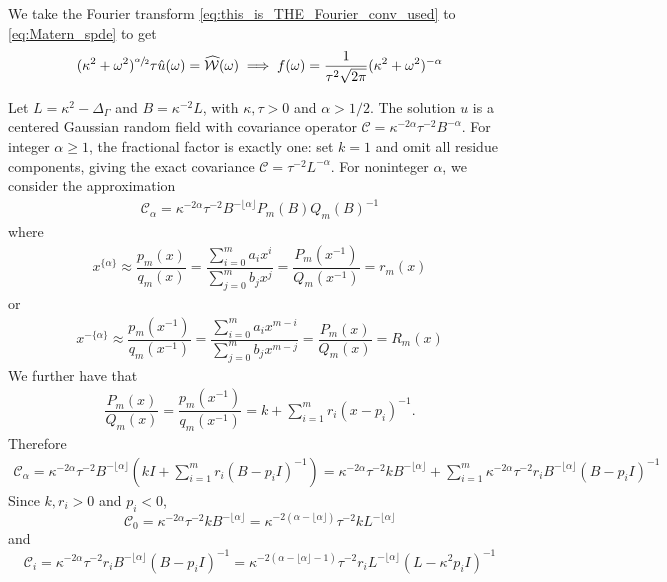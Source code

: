 \documentclass[11pt,a4paper]{article}
\theoremstyle{plain}
\theoremstyle{definition}
\begin{document}
We take the Fourier transform \eqref{eq:this_is_THE_Fourier_conv_used} to \eqref{eq:Matern_spde} to get
\begin{align}
    (\kappa^2+\omega^2)^{\sfrac{\alpha}{2}}\tau\hat{u}(\omega) = \widehat{\mathcal{W}}(\omega)\implies
    f(\omega) = \dfrac{1}{\tau^2\sqrt{2\pi}}(\kappa^2+\omega^2)^{-\alpha}
\end{align}

Let $L = \kappa^2 - \Delta_\Gamma$ and $B =\kappa^{-2}L$, with
$\kappa,\tau>0$ and $\alpha>1/2$. The solution $u$ is a centered
Gaussian random field with covariance operator
$\mathcal{C} = \kappa^{-2\alpha}\tau^{-2}B^{-\alpha}$.
For integer $\alpha\geq1$, the fractional factor is exactly one:
set $k=1$ and omit all residue components, giving the exact covariance
$\mathcal C=\tau^{-2}L^{-\alpha}$.
For noninteger $\alpha$, we consider the approximation
\begin{align}
    \mathcal{C}_\alpha = \kappa^{-2\alpha}\tau^{-2}B^{-\lfloor\alpha\rfloor}P_m(B)Q_m(B)^{-1}
\end{align}
where 
\begin{align}
    x^{\{\alpha\}}\approx \dfrac{p_m(x)}{q_m(x)} = \dfrac{\sum_{i=0}^m a_ix^{i}}{\sum_{j=0}^m b_jx^{j}} = \dfrac{P_m(x^{-1})}{Q_m(x^{-1})} =r_m(x)
\end{align}
or
\begin{align}
\label{eq:rat_approx}
    x^{-\{\alpha\}}\approx \dfrac{p_m(x^{-1})}{q_m(x^{-1})} = \dfrac{\sum_{i=0}^m a_ix^{m-i}}{\sum_{j=0}^m b_jx^{m-j}} = \dfrac{P_m(x)}{Q_m(x)} = R_m(x)
\end{align}
We further have that
\begin{align}
\label{eq:partial_frac_dec}
    \dfrac{P_m(x)}{Q_m(x)} = \dfrac{p_m(x^{-1})}{q_m(x^{-1})} =k + \sum_{i=1}^mr_i(x-p_i)^{-1}.
\end{align}
Therefore
\begin{align}
    \mathcal{C}_\alpha = \kappa^{-2\alpha}\tau^{-2}B^{-\lfloor\alpha\rfloor}\left(kI + \sum_{i=1}^mr_i(B-p_iI)^{-1}\right) = \kappa^{-2\alpha}\tau^{-2}kB^{-\lfloor\alpha\rfloor} + \sum_{i=1}^m\kappa^{-2\alpha}\tau^{-2}r_iB^{-\lfloor\alpha\rfloor}(B-p_iI)^{-1}
\end{align}
Since $k,r_i>0$ and $p_i<0$, 
$$\mathcal{C}_0 = \kappa^{-2\alpha}\tau^{-2}kB^{-\lfloor\alpha\rfloor}= \kappa^{-2(\alpha-\lfloor\alpha\rfloor)}\tau^{-2}kL^{-\lfloor\alpha\rfloor}$$
 and 
 $$\mathcal{C}_i = \kappa^{-2\alpha}\tau^{-2}r_iB^{-\lfloor\alpha\rfloor}(B-p_iI)^{-1} = \kappa^{-2(\alpha-\lfloor\alpha\rfloor-1)}\tau^{-2}r_iL^{-\lfloor\alpha\rfloor}(L-\kappa^2p_iI)^{-1}$$
\end{document}
